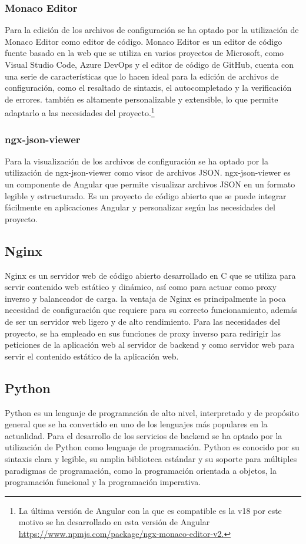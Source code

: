 \documentclass[12pt, a4paper, twoside]{article}
\begin{document}
\subsubsection{Monaco Editor}
\cite{monaco_editor} Para la edición de los archivos de configuración se ha optado por la utilización de Monaco Editor como editor de código.
Monaco Editor es un editor de código fuente basado en la web que se utiliza en varios proyectos de Microsoft, como Visual Studio Code, Azure DevOps y el editor de código de GitHub,
cuenta con una serie de características que lo hacen ideal para la edición de archivos de configuración, como el resaltado de sintaxis, el autocompletado y la verificación de errores.
también es altamente personalizable y extensible, lo que permite adaptarlo a las necesidades del proyecto.\footnote{La última versión de Angular con la que es compatible es la v18 por este motivo se ha desarrollado en esta versión de Angular \href{https://www.npmjs.com/package/ngx-monaco-editor-v2}{https://www.npmjs.com/package/ngx-monaco-editor-v2.}}
\subsubsection{ngx-json-viewer}
\cite{ngx_json_viewer}
Para la visualización de los archivos de configuración se ha optado por la utilización de ngx-json-viewer como visor de archivos JSON.
ngx-json-viewer es un componente de Angular que permite visualizar archivos JSON en un formato legible y estructurado. Es un proyecto de código abierto que se puede integrar fácilmente en aplicaciones Angular y personalizar según las necesidades del proyecto.

\subsection{Nginx}
\cite{nginx} 
Nginx es un servidor web de código abierto desarrollado en C que se utiliza para servir contenido web estático y dinámico, así como para actuar como proxy inverso y balanceador de carga.
la ventaja de Nginx es principalmente la poca necesidad de configuración que requiere para su correcto funcionamiento, además de ser un servidor web ligero y de alto rendimiento.
Para las necesidades del proyecto, se ha empleado en sus funciones de proxy inverso para redirigir las peticiones de la aplicación web al servidor de backend y como servidor web para servir el contenido estático de la aplicación web.

\subsection{Python}
\cite{python}
Python es un lenguaje de programación de alto nivel, interpretado y de propósito general que se ha convertido en uno de los lenguajes más populares en la actualidad.
Para el desarrollo de los servicios de backend se ha optado por la utilización de Python como lenguaje de programación.
Python es conocido por su sintaxis clara y legible, su amplia biblioteca estándar y su soporte para múltiples paradigmas de programación, como la programación orientada a objetos, la programación funcional y la programación imperativa.
\end{document}
